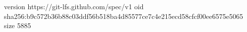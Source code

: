 version https://git-lfs.github.com/spec/v1
oid sha256:b9c572b36b88c03ddf56b518ba4d85577ce7c4e215ecd58cfcf00ee6575e5065
size 5885
